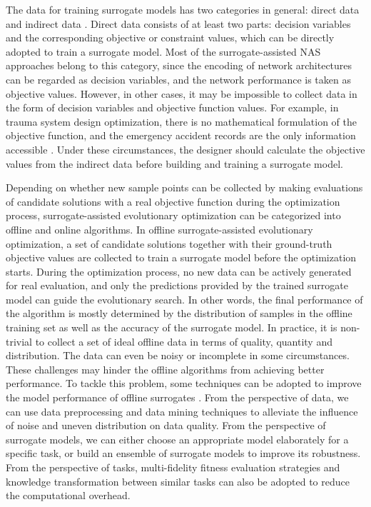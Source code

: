 \documentclass[journal]{IEEEtran}
\begin{document}
The data for training surrogate models has two categories in general: direct data and indirect data \cite{jin2018data, sun2021data}. Direct data consists of at least two parts: decision variables and the corresponding objective or constraint values, which can be directly adopted to train a surrogate model. Most of the surrogate-assisted NAS approaches belong to this category, since the encoding of network architectures can be regarded as decision variables, and the network performance is taken as objective values. However, in other cases, it may be impossible to collect data in the form of decision variables and objective function values. For example, in trauma system design optimization, there is no mathematical formulation of the objective function, and the emergency accident records are the only information accessible \cite{wang2016data}. Under these circumstances, the designer should calculate the objective values from the indirect data before building and training a surrogate model.

Depending on whether new sample points can be collected by making evaluations of candidate solutions with a real objective function during the optimization process, surrogate-assisted evolutionary optimization can be categorized into offline and online algorithms. In offline surrogate-assisted evolutionary optimization, a set of candidate solutions together with their ground-truth objective values are collected to train a surrogate model before the optimization starts. During the optimization process, no new data can be actively generated for real evaluation, and only the predictions provided by the trained surrogate model can guide the evolutionary search. In other words, the final performance of the algorithm is mostly determined by the distribution of samples in the offline training set as well as the accuracy of the surrogate model. In practice, it is non-trivial to collect a set of ideal offline data in terms of quality, quantity and distribution. The data can even be noisy or incomplete in some circumstances. These challenges may hinder the offline algorithms from achieving better performance. To tackle this problem, some techniques can be adopted to improve the model performance of offline surrogates \cite{sun2021data}. From the perspective of data, we can use data preprocessing and data mining techniques to alleviate the influence of noise and uneven distribution on data quality. From the perspective of surrogate models, we can either choose an appropriate model elaborately for a specific task, or build an ensemble of surrogate models to improve its robustness. From the perspective of tasks, multi-fidelity fitness evaluation strategies and knowledge transformation between similar tasks can also be adopted to reduce the computational overhead.
\end{document}
